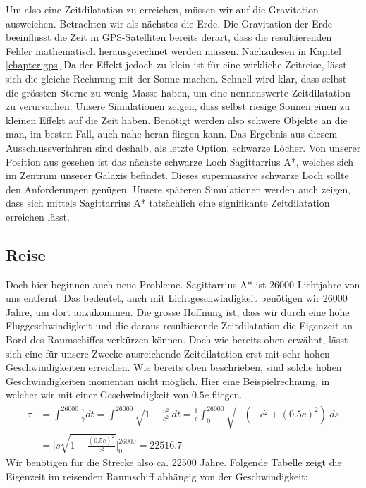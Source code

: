 \begin{refsection}
    Um also eine Zeitdilatation zu erreichen, müssen wir auf die Gravitation ausweichen. Betrachten wir als nächstes die Erde. Die Gravitation der Erde beeinflusst die Zeit in GPS-Satelliten bereits derart, dass die resultierenden Fehler mathematisch herausgerechnet werden müssen. Nachzulesen in Kapitel \ref{chapter:gps} %
    Da der Effekt jedoch zu klein ist für eine wirkliche Zeitreise, lässt sich die gleiche Rechnung mit der Sonne machen. Schnell wird klar, dass selbst die grössten Sterne zu wenig Masse haben, um eine nennenswerte Zeitdilatation zu verursachen. Unsere Simulationen zeigen, dass selbst riesige Sonnen einen zu kleinen Effekt auf die Zeit haben.
    Benötigt werden also schwere Objekte an die man, im besten Fall, auch nahe heran fliegen kann. Das Ergebnis aus diesem Ausschlussverfahren sind deshalb, als letzte Option, schwarze Löcher. Von unserer Position aus gesehen ist das nächste schwarze Loch Sagittarrius A*, welches sich im Zentrum unserer Galaxis befindet. Dieses supermassive schwarze Loch sollte den Anforderungen genügen. Unsere späteren Simulationen werden auch zeigen, dass sich mittels Sagittarrius A* tatsächlich eine signifikante Zeitdilatation erreichen lässt.
    
    \subsection{Reise}
    
    Doch hier beginnen auch neue Probleme. Sagittarrius A* ist 26000 Lichtjahre von uns entfernt. Das bedeutet, auch mit Lichtgeschwindigkeit benötigen wir 26000 Jahre, um dort anzukommen. Die grosse Hoffnung ist, dass wir durch eine hohe Fluggeschwindigkeit und die daraus resultierende Zeitdilatation die Eigenzeit an Bord des Raumschiffes verkürzen können. 
    Doch wie bereits oben erwähnt, lässt sich eine für unsere Zwecke ausreichende Zeitdilatation erst mit sehr hohen Geschwindigkeiten erreichen. Wie bereits oben beschrieben, sind solche hohen Geschwindigkeiten momentan nicht möglich.
    Hier eine Beispielrechnung, in welcher wir mit einer Geschwindigkeit von $0.5c$ fliegen.
	\begin{align*}
	\tau
	&= 
	\int_{}^{26000}\frac{1}{\gamma}dt=\int_{}^{26000}\sqrt{1-\frac{v^2}{c^2}}\,dt
	= 
	\frac{1}{c}\int_{0}^{26000}\sqrt{-(-c^2+(0.5c)^2)}\,ds\\
	&=
	\biggl[s\sqrt{1-\frac{(0.5c)^{2}}{c^2}}\biggr]_0^{26000}
	=
	22516.7
	\end{align*}
	Wir benötigen für die Strecke also ca. 22500 Jahre.
	Folgende Tabelle zeigt die Eigenzeit im reisenden Raumschiff abhängig von der Geschwindigkeit:
	

\end{refsection}
